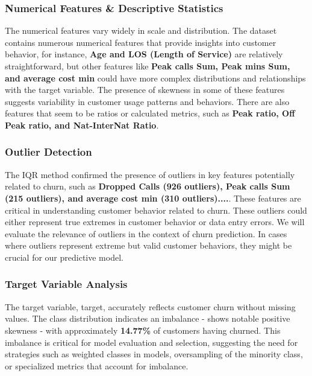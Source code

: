 \documentclass{article}
\begin{document}
\subsubsection{Numerical Features \& Descriptive Statistics}


The numerical features vary widely in scale and distribution. The dataset contains numerous numerical features that provide insights into customer behavior, for instance, \textbf{Age and LOS (Length of Service)} are relatively straightforward, but other features like \textbf{Peak calls Sum, Peak mins Sum, and average cost min} could have more complex distributions and relationships with the target variable. The presence of skewness in some of these features suggests variability in customer usage patterns and behaviors.
 There are also features that seem to be ratios or calculated metrics, such as \textbf{Peak ratio, Off Peak ratio, and Nat-InterNat Ratio}.




\subsubsection{Outlier Detection}


The IQR method confirmed the presence of outliers in key features potentially related to churn, such as \textbf{Dropped Calls (926 outliers), Peak calls Sum (215 outliers), and average cost min (310 outliers)....}. These features are critical in understanding customer behavior related to churn. These outliers could either represent true extremes in customer behavior or data entry errors. We will evaluate the relevance of outliers in the context of churn prediction. In cases where outliers represent extreme but valid customer behaviors, they might be crucial for our predictive model.



\subsubsection{Target Variable Analysis}


 The target variable, target, accurately reflects customer churn without missing values. The class distribution indicates an imbalance - shows notable positive skewness - with approximately \textbf{14.77\%} of customers having churned. This imbalance is critical for model evaluation and selection, suggesting the need for strategies such as weighted classes in models, oversampling of the minority class, or specialized metrics that account for imbalance.
\end{document}
